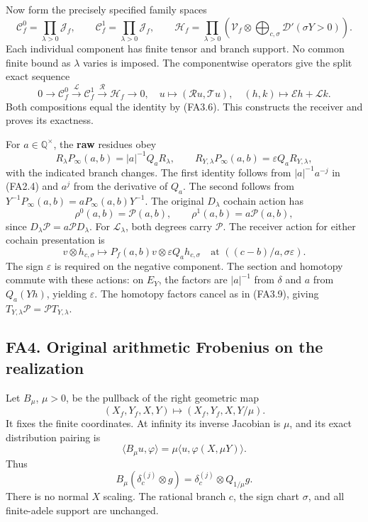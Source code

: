 Now form the precisely specified family spaces \[
 \mathcal C^0_f=\prod_{\lambda>0}\mathcal J_f,\qquad
 \mathcal C^1_f=\prod_{\lambda>0}\mathcal J_f,\qquad
 \mathcal H_f=
 \prod_{\lambda>0}\left(
  \mathscr V_f\otimes
   \bigoplus_{c,\sigma}\mathcal D'(\sigma Y>0)\right).
\tag{FA3.7}
\] Each individual component has finite tensor and branch support. No
common finite bound as \(\lambda\) varies is imposed. The componentwise
operators give the split exact sequence \[
 0\longrightarrow\mathcal C^0_f
 \xrightarrow{\mathcal L}\mathcal C^1_f
 \xrightarrow{\mathcal R}\mathcal H_f
 \longrightarrow0,
\quad
 u\longmapsto(\mathcal Ru,\mathcal Tu),\quad
 (h,k)\longmapsto\mathcal Eh+\mathcal Lk.
\tag{FA3.8}
\] Both compositions equal the identity by (FA3.6). This constructs the
receiver and proves its exactness.

For \(a\in\mathbb Q^\times\), the \textbf{raw} residues obey \[
 R_\lambda P_\infty(a,b)
      =|a|^{-1}Q_aR_\lambda,\qquad
 R_{Y,\lambda}P_\infty(a,b)
      =\varepsilon Q_aR_{Y,\lambda},
\tag{FA3.9}
\] with the indicated branch changes. The first identity follows from
\(|a|^{-1}a^{-j}\) in (FA2.4) and \(a^j\) from the derivative of
\(Q_a\). The second follows from
\(Y^{-1}P_\infty(a,b)=aP_\infty(a,b)Y^{-1}\). The original \(D_\lambda\)
cochain action has \[
 \rho^0(a,b)=\mathcal P(a,b),\qquad
 \rho^1(a,b)=a\mathcal P(a,b),
\tag{FA3.10}
\] since \(D_\lambda\mathcal P=a\mathcal P D_\lambda\). For
\(\mathcal L_\lambda\), both degrees carry \(\mathcal P\). The receiver
action for either cochain presentation is \[
 v\otimes h_{c,\sigma}
   \longmapsto
 P_f(a,b)v\otimes
       \varepsilon Q_a h_{c,\sigma}
 \quad\text{at }((c-b)/a,\sigma\varepsilon).
\tag{FA3.11}
\] The sign \(\varepsilon\) is required on the negative component. The
section and homotopy commute with these actions: on \(E_Y\), the factors
are \(|a|^{-1}\) from \(\delta\) and \(a\) from \(Q_a(Yh)\), yielding
\(\varepsilon\). The homotopy factors cancel as in (FA3.9), giving
\(T_{Y,\lambda}\mathcal P=\mathcal P T_{Y,\lambda}\).

\subsection{FA4. Original arithmetic Frobenius on the
realization}\label{fa4.-original-arithmetic-frobenius-on-the-realization}

Let \(B_\mu\), \(\mu>0\), be the pullback of the right geometric map \[
 (X_f,Y_f,X,Y)\longmapsto(X_f,Y_f,X,Y/\mu).
\tag{FA4.1}
\] It fixes the finite coordinates. At infinity its inverse Jacobian is
\(\mu\), and its exact distribution pairing is \[
 \langle B_\mu u,\varphi\rangle
   =\mu\langle u,\varphi(X,\mu Y)\rangle.
\tag{FA4.2}
\] Thus \[
 B_\mu(\delta_c^{(j)}\otimes g)
      =\delta_c^{(j)}\otimes Q_{1/\mu}g.
\tag{FA4.3}
\] There is no normal \(X\) scaling. The rational branch \(c\), the sign
chart \(\sigma\), and all finite-adele support are unchanged.

